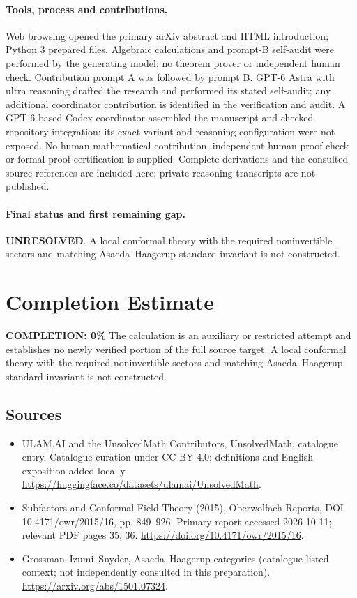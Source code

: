 \documentclass[11pt]{article}
\begin{document}
\paragraph{Tools, process and contributions.}
Web browsing opened the primary arXiv abstract and HTML introduction; Python 3 prepared files. Algebraic calculations and prompt-B self-audit were performed by the generating model; no theorem prover or independent human check. Contribution prompt A was followed by prompt B. GPT-6 Astra with ultra reasoning drafted the research and performed its stated self-audit; any additional coordinator contribution is identified in the verification and audit. A GPT-6-based Codex coordinator assembled the manuscript and checked repository integration; its exact variant and reasoning configuration were not exposed. No human mathematical contribution, independent human proof check or formal proof certification is supplied. Complete derivations and the consulted source references are included here; private reasoning transcripts are not published.

\paragraph{Final status and first remaining gap.}
\textbf{UNRESOLVED}. A local conformal theory with the required noninvertible sectors and matching Asaeda–Haagerup standard invariant is not constructed.

\section{Completion Estimate}
\noindent\textbf{COMPLETION: 0\%}
The calculation is an auxiliary or restricted attempt and establishes no newly verified portion of the full source target. A local conformal theory with the required noninvertible sectors and matching Asaeda–Haagerup standard invariant is not constructed.

\subsection{Sources}
\begin{itemize}
\item[\hypertarget{source:statement:1}{S1}] ULAM.AI and the UnsolvedMath Contributors, UnsolvedMath, catalogue entry. Catalogue curation under CC BY 4.0; definitions and English exposition added locally.
\url{https://huggingface.co/datasets/ulamai/UnsolvedMath}.
\item[\hypertarget{source:statement:2}{S2}] Subfactors and Conformal Field Theory (2015), Oberwolfach Reports, DOI 10.4171/owr/2015/16, pp. 849--926. Primary report accessed 2026-10-11; relevant PDF pages 35, 36.
\url{https://doi.org/10.4171/owr/2015/16}.
\item[\hypertarget{source:statement:3}{S3}] Grossman--Izumi--Snyder, Asaeda--Haagerup categories (catalogue-listed context; not independently consulted in this preparation).
\url{https://arxiv.org/abs/1501.07324}.
\end{itemize}
\label{end:statement}
\end{document}
